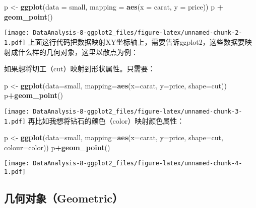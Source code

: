 \documentclass[]{article}
\newenvironment{Shaded}{\begin{snugshade}}{\end{snugshade}}
\newcommand{\KeywordTok}[1]{\textcolor[rgb]{0.13,0.29,0.53}{\textbf{#1}}}
\newcommand{\DataTypeTok}[1]{\textcolor[rgb]{0.13,0.29,0.53}{#1}}
\newcommand{\StringTok}[1]{\textcolor[rgb]{0.31,0.60,0.02}{#1}}
\newcommand{\OperatorTok}[1]{\textcolor[rgb]{0.81,0.36,0.00}{\textbf{#1}}}
\newcommand{\NormalTok}[1]{#1}
\begin{document}
\begin{Shaded}
\begin{Highlighting}[]
\NormalTok{p <-}\StringTok{ }\KeywordTok{ggplot}\NormalTok{(}\DataTypeTok{data =}\NormalTok{ small, }\DataTypeTok{mapping =} \KeywordTok{aes}\NormalTok{(}\DataTypeTok{x =}\NormalTok{ carat, }\DataTypeTok{y =}\NormalTok{ price))}
\NormalTok{p }\OperatorTok{+}\StringTok{ }\KeywordTok{geom_point}\NormalTok{()}
\end{Highlighting}
\end{Shaded}

\texttt{[image: DataAnalysis-8-ggplot2\_files/figure-latex/unnamed-chunk-2-1.pdf]}
上面这行代码把数据映射XY坐标轴上，需要告诉ggplot2，这些数据要映射成什么样的几何对象，这里以散点为例：

如果想将切工（cut）映射到形状属性。只需要：

\begin{Shaded}
\begin{Highlighting}[]
\NormalTok{p <-}\StringTok{ }\KeywordTok{ggplot}\NormalTok{(}\DataTypeTok{data=}\NormalTok{small, }\DataTypeTok{mapping=}\KeywordTok{aes}\NormalTok{(}\DataTypeTok{x=}\NormalTok{carat, }\DataTypeTok{y=}\NormalTok{price, }\DataTypeTok{shape=}\NormalTok{cut)) }
\NormalTok{p}\OperatorTok{+}\KeywordTok{geom_point}\NormalTok{()}
\end{Highlighting}
\end{Shaded}

\texttt{[image: DataAnalysis-8-ggplot2\_files/figure-latex/unnamed-chunk-3-1.pdf]}
再比如我想将钻石的颜色（color）映射颜色属性：

\begin{Shaded}
\begin{Highlighting}[]
\NormalTok{p <-}\StringTok{ }\KeywordTok{ggplot}\NormalTok{(}\DataTypeTok{data=}\NormalTok{small, }\DataTypeTok{mapping=}\KeywordTok{aes}\NormalTok{(}\DataTypeTok{x=}\NormalTok{carat, }\DataTypeTok{y=}\NormalTok{price, }\DataTypeTok{shape=}\NormalTok{cut, }\DataTypeTok{colour=}\NormalTok{color))}
\NormalTok{p}\OperatorTok{+}\KeywordTok{geom_point}\NormalTok{()}
\end{Highlighting}
\end{Shaded}

\texttt{[image: DataAnalysis-8-ggplot2\_files/figure-latex/unnamed-chunk-4-1.pdf]}

\subsection{几何对象（Geometric）}\label{geometric}
\end{document}
